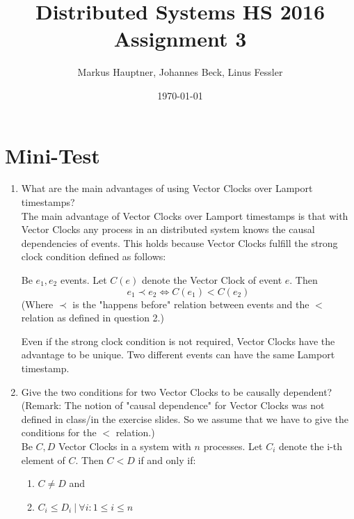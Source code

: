 \documentclass[11pt]{article}
\title{Distributed Systems HS 2016\\Assignment 3}
\author{Markus Hauptner, Johannes Beck, Linus Fessler}
\date{\today}
\begin{document}
\maketitle

\section{Mini-Test}

\begin{enumerate}

\item {What are the main advantages of using Vector Clocks over Lamport timestamps?} \vspace{4pt}\\ 
The main advantage of Vector Clocks over Lamport timestamps is that with Vector Clocks any process in an distributed system knows the causal dependencies of events. This holds because Vector Clocks fulfill the strong clock condition defined as follows:

Be $e_1,e_2$ events. Let $C(e)$ denote the Vector Clock of event $e$. Then $$e_1 \prec e_2 \Longleftrightarrow C(e_1) < C(e_2)$$ (Where $\prec$ is the "happens before" relation between events and the $<$ relation as defined in question 2.)

Even if the strong clock condition is not required, Vector Clocks have the advantage to be unique. Two different events can have the same Lamport timestamp.\\


\item {Give the two conditions for two Vector Clocks to be causally dependent?} \vspace{4pt}\\ 
(Remark: The notion of "causal dependence" for Vector Clocks was not defined in class/in the exercise slides. So we assume that we have to give the conditions for the $<$ relation.) \\
Be $C,D$ Vector Clocks in a system with $n$ processes. Let $C_i$ denote the i-th element of $C$. Then $C < D$ if and only if: 
\begin{enumerate}
\item $C \not= D$ and
\item $C_i \le D_i ~|~\forall i : 1 \le i \le n$
\end{enumerate}



\end{enumerate}
\end{document}
